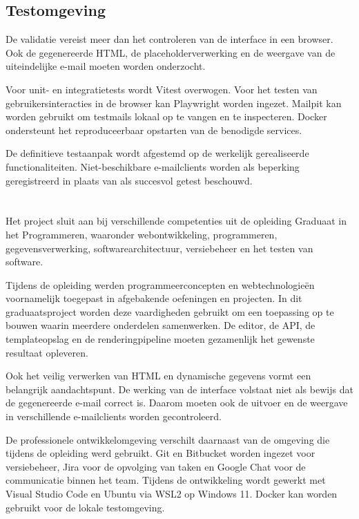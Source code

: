 \subsection{Testomgeving}
De validatie vereist meer dan het controleren van de interface in een
browser. Ook de gegenereerde HTML, de placeholderverwerking en de
weergave van de uiteindelijke e-mail moeten worden onderzocht.

Voor unit- en integratietests wordt Vitest overwogen. Voor het testen van
gebruikersinteracties in de browser kan Playwright worden ingezet. Mailpit
kan worden gebruikt om testmails lokaal op te vangen en te inspecteren.
Docker ondersteunt het reproduceerbaar opstarten van de benodigde services.

De definitieve testaanpak wordt afgestemd op de werkelijk gerealiseerde
functionaliteiten. Niet-beschikbare e-mailclients worden als beperking
geregistreerd in plaats van als succesvol getest beschouwd.

\section{}%
\label{sec:vergelijking-opleiding}
Het project sluit aan bij verschillende competenties uit de opleiding
Graduaat in het Programmeren, waaronder webontwikkeling, programmeren,
gegevensverwerking, softwarearchitectuur, versiebeheer en het testen van
software.

Tijdens de opleiding werden programmeerconcepten en webtechnologieën
voornamelijk toegepast in afgebakende oefeningen en projecten. In dit
graduaatsproject worden deze vaardigheden gebruikt om een toepassing op te
bouwen waarin meerdere onderdelen samenwerken. De editor, de API, de
templateopslag en de renderingpipeline moeten gezamenlijk het gewenste
resultaat opleveren.

Ook het veilig verwerken van HTML en dynamische gegevens vormt een belangrijk
aandachtspunt. De werking van de interface volstaat niet als bewijs dat
de gegenereerde e-mail correct is. Daarom moeten ook de uitvoer en de
weergave in verschillende e-mailclients worden gecontroleerd.

De professionele ontwikkelomgeving verschilt daarnaast van de omgeving
die tijdens de opleiding werd gebruikt. Git en Bitbucket worden ingezet
voor versiebeheer, Jira voor de opvolging van taken en Google Chat voor
de communicatie binnen het team. Tijdens de ontwikkeling wordt gewerkt
met Visual Studio Code en Ubuntu via WSL2 op Windows 11. Docker kan worden
gebruikt voor de lokale testomgeving.

